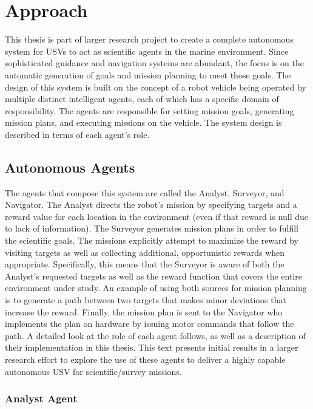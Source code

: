 \documentclass{tamuccthesis}
\begin{document}
\section{Approach}

This thesis is part of larger research project to create a complete autonomous system for USVs to act as scientific agents in the marine environment. Since sophisticated guidance and navigation systems are abundant, the focus is on the automatic generation of goals and mission planning to meet those goals. The design of this system is built on the concept of a robot vehicle being operated by multiple distinct intelligent agents, each of which has a specific domain of responsibility. The agents are responsible for setting mission goals, generating mission plans, and executing missions on the vehicle. The system design is described in terms of each agent's role.

\subsection{Autonomous Agents}

The agents that compose this system are called the Analyst, Surveyor, and Navigator. The Analyst directs the robot's mission by specifying targets and a reward value for each location in the environment (even if that reward is null due to lack of information). The Surveyor generates mission plans in order to fulfill the scientific goals. The missions explicitly attempt to maximize the reward by visiting targets as well as collecting additional, opportunistic rewards when appropriate. Specifically, this means that the Surveyor is aware of both the Analyst's requested targets as well as the reward function that covers the entire environment under study. An example of using both sources for mission planning is to generate a path between two targets that makes minor deviations that increase the reward. Finally, the mission plan is sent to the Navigator who implements the plan on hardware by issuing motor commands that follow the path. A detailed look at the role of each agent follows, as well as a description of their implementation in this thesis. This text presents initial results in a larger research effort to explore the use of these agents to deliver a highly capable autonomous USV for scientific/survey missions. 

\subsubsection{Analyst Agent}
\end{document}
